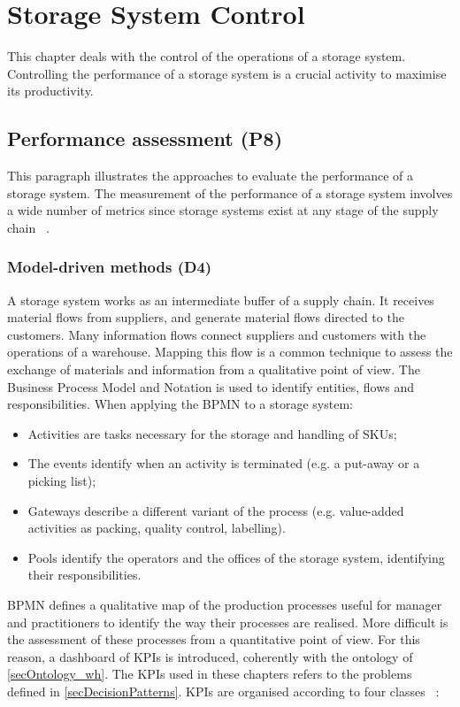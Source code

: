 \chapter{Storage System Control} \label{chapWhControl}

This chapter deals with the control of the operations of a storage system. Controlling the performance of a storage system is a crucial activity to maximise its productivity.

\section{Performance assessment (P8)}
This paragraph illustrates the approaches to evaluate the performance of a storage system. The measurement of the performance of a storage system involves a wide number of metrics since storage systems exist at any stage of the supply chain ~\cite{Accorsi2017a_wh, Malmborg2000, Manzini2007, Staudt2015}.

\subsection{Model-driven methods (D4)}

A storage system works as an intermediate buffer of a supply chain. It receives material flows from suppliers, and generate material flows directed to the customers. Many information flows connect suppliers and customers with the operations of a warehouse. Mapping this flow is a common technique to assess the exchange of materials and information from a qualitative point of view. The Business Process Model and Notation is used to identify entities, flows and responsibilities. When applying the BPMN to a storage system:

\begin{itemize}
    \item Activities are tasks necessary for the storage and handling of SKUs;
    \item The events identify when an activity is terminated (e.g. a put-away or a picking list);
    \item Gateways describe a different variant of the process (e.g. value-added activities as packing, quality control, labelling).
    \item Pools identify the operators and the offices of the storage system, identifying their responsibilities.

\end{itemize}

BPMN defines a qualitative map of the production processes useful for manager and practitioners to identify the way their processes are realised. More difficult is the assessment of these processes from a quantitative point of view. For this reason, a dashboard of KPIs is introduced, coherently with the ontology of \ref{secOntology_wh}. The KPIs used in these chapters refers to the problems defined in \ref{secDecisionPatterns}. KPIs are organised according to four classes ~\cite{Tufano2018_wh}:

